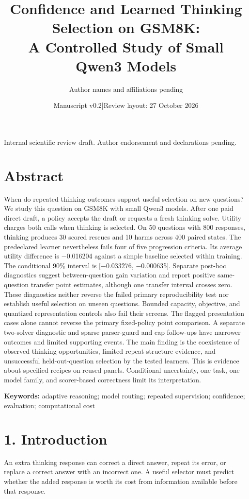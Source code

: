 \documentclass[11pt,a4paper]{article}
\title{Confidence and Learned Thinking Selection on GSM8K:\\ A Controlled Study of Small Qwen3 Models}
\author{Author names and affiliations pending}
\date{Manuscript v0.2\quad |\quad Review layout: 27 October 2026}
\begin{document}
\maketitle
\begin{center}\small Internal scientific review draft. Author endorsement and declarations pending.\end{center}
\linenumbers
\section*{Abstract}\label{sec:abstract}
When do repeated thinking outcomes support useful selection on new questions? We study this question on GSM8K with small Qwen3 models. After one paid direct draft, a policy accepts the draft or requests a fresh thinking solve. Utility charges both calls when thinking is selected. On 50 questions with 800 responses, thinking produces 30 scored rescues and 10 harms across 400 paired states. The predeclared learner nevertheless fails four of five progression criteria. Its average utility difference is \ensuremath{-}0.016204 against a simple baseline selected within training. The conditional 90\% interval is [\ensuremath{-}0.033276, \ensuremath{-}0.000635]. Separate post-hoc diagnostics suggest between-question gain variation and report positive same-question transfer point estimates, although one transfer interval crosses zero. These diagnostics neither reverse the failed primary reproducibility test nor establish useful selection on unseen questions. Bounded capacity, objective, and quantized representation controls also fail their screens. The flagged presentation cases alone cannot reverse the primary fixed-policy point comparison. A separate two-solver diagnostic and sparse parser-guard and cap follow-ups have narrower outcomes and limited supporting events. The main finding is the coexistence of observed thinking opportunities, limited repeat-structure evidence, and unsuccessful held-out-question selection by the tested learners. This is evidence about specified recipes on reused panels. Conditional uncertainty, one task, one model family, and scorer-based correctness limit its interpretation.

\textbf{Keywords:} adaptive reasoning; model routing; repeated supervision; confidence; evaluation; computational cost

\section*{1. Introduction}\label{sec:1-introduction}
An extra thinking response can correct a direct answer, repeat its error, or replace a correct answer with an incorrect one. A useful selector must predict whether the added response is worth its cost from information available before that response.
\end{document}
